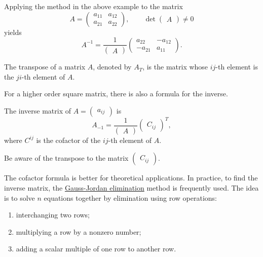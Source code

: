 Applying the method in the above example to the matrix
\[
  A=\begin{pmatrix}
  a_{11} & a_{12}\\
  a_{21} & a_{22}
\end{pmatrix}, \qquad \det\begin{pmatrix}
  A
\end{pmatrix}\ne 0\]
yields
\[
  A^{-1}=\frac{1}{\begin{pmatrix}
    A
  \end{pmatrix}}
  \begin{pmatrix}
    a_{22} & -a_{12}\\
    -a_{21} & a_{11}
  \end{pmatrix}.
\]

The transpose of a matrix $A$, denoted by $A_T$, is the matrix whose $ij$-th element is the $ji$-th element of $A$.

For a higher order square matrix, there is also a formula for the inverse.

\begin{theorem}
  The inverse matrix of $A=\begin{pmatrix} a_{ij} \end{pmatrix}$ 
  is
  \[
    A_{-1}=\frac{1}{\begin{pmatrix}
    A
  \end{pmatrix}}\begin{pmatrix}
    C_{ij}
  \end{pmatrix}^T,
  \]
  where $C^{ij}$ is the cofactor of the $ij$-th element of $A$.
\end{theorem}

Be aware of the transpose to the matrix $\begin{pmatrix} C_{ij} \end{pmatrix}$.

The cofactor formula is better for theoretical applications. 
In practice, to find the inverse matrix, the \href{https://en.wikipedia.org/wiki/Gaussian_elimination}{Gauss-Jordan elimination} method is frequently used. The idea is to solve $n$ equations together by elimination using row operations:
\begin{enumerate}
  \item interchanging two rows;
  \item multiplying a row by a nonzero number;
  \item adding a scalar multiple of one row to another row.
\end{enumerate}

